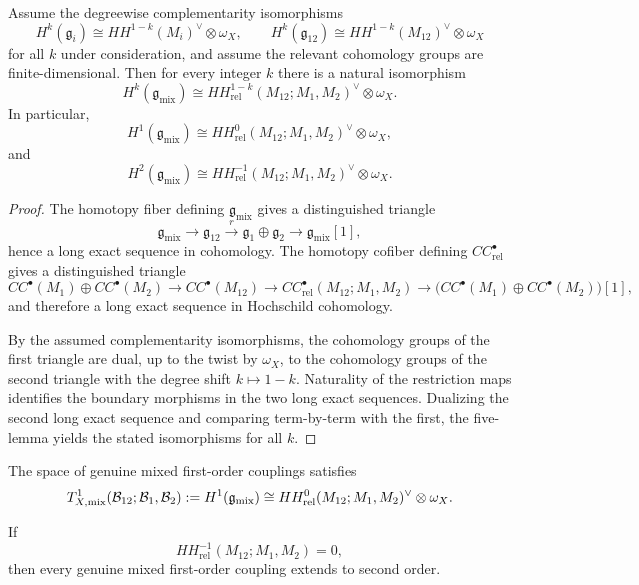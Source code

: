 \begin{theorem}
\label{thm:relative-duality-theorem}
Assume the degreewise complementarity isomorphisms
\[
H^k(\mathfrak g_i)
\cong
HH^{1-k}(M_i)^\vee\otimes \omega_X,
\qquad
H^k(\mathfrak g_{12})
\cong
HH^{1-k}(M_{12})^\vee\otimes \omega_X
\]
for all $k$ under consideration, and assume the relevant cohomology groups are finite-dimensional. Then for every integer $k$ there is a natural isomorphism
\[
H^k(\mathfrak g_{\mathrm{mix}})
\cong
HH^{1-k}_{\mathrm{rel}}(M_{12};M_1,M_2)^\vee\otimes \omega_X.
\]
In particular,
\[
H^1(\mathfrak g_{\mathrm{mix}})
\cong
HH^{0}_{\mathrm{rel}}(M_{12};M_1,M_2)^\vee\otimes \omega_X,
\]
and
\[
H^2(\mathfrak g_{\mathrm{mix}})
\cong
HH^{-1}_{\mathrm{rel}}(M_{12};M_1,M_2)^\vee\otimes \omega_X.
\]
\end{theorem}

\begin{proof}
The homotopy fiber defining $\mathfrak g_{\mathrm{mix}}$ gives a distinguished triangle
\[
\mathfrak g_{\mathrm{mix}} \to \mathfrak g_{12} \xrightarrow{r} \mathfrak g_1\oplus \mathfrak g_2 \to \mathfrak g_{\mathrm{mix}}[1],
\]
hence a long exact sequence in cohomology. The homotopy cofiber defining $CC^\bullet_{\mathrm{rel}}$ gives a distinguished triangle
\[
CC^\bullet(M_1)\oplus CC^\bullet(M_2)
\to CC^\bullet(M_{12})
\to CC^\bullet_{\mathrm{rel}}(M_{12};M_1,M_2)
\to
\big(CC^\bullet(M_1)\oplus CC^\bullet(M_2)\big)[1],
\]
and therefore a long exact sequence in Hochschild cohomology.

By the assumed complementarity isomorphisms, the cohomology groups of the first triangle are dual, up to the twist by $\omega_X$, to the cohomology groups of the second triangle with the degree shift $k\mapsto 1-k$. Naturality of the restriction maps identifies the boundary morphisms in the two long exact sequences. Dualizing the second long exact sequence and comparing term-by-term with the first, the five-lemma yields the stated isomorphisms for all $k$.
\end{proof}

\begin{corollary}
\label{cor:relative-tangent-center-principle}
The space of genuine mixed first-order couplings satisfies
\[
T^1_{X,\mathrm{mix}}(\mathcal{B}_{12};\mathcal{B}_1,\mathcal{B}_2)
:= H^1(\mathfrak g_{\mathrm{mix}})
\cong
HH^{0}_{\mathrm{rel}}(M_{12};M_1,M_2)^\vee\otimes \omega_X.
\]
\end{corollary}

\begin{corollary}
\label{cor:relative-dual-unobstructedness}
If
\[
HH^{-1}_{\mathrm{rel}}(M_{12};M_1,M_2)=0,
\]
then every genuine mixed first-order coupling extends to second order.
\end{corollary}

